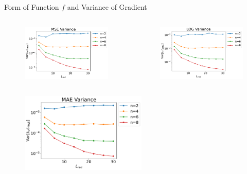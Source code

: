 \documentclass[dvipdfmx,10pt,aspectratio=169]{beamer}
\begin{document}
\begin{frame}{Form of Function $f$ and Variance of Gradient}
    \vspace{-10pt}
    \begin{columns}
        \begin{column}{0.5\textwidth}
            \begin{figure}
                \centering\includegraphics[width=6cm]{variance-mse_encoding3.pdf}
            \end{figure}
        \end{column}
        \begin{column}{0.5\textwidth}
            \begin{figure}
                \centering\includegraphics[width=6cm]{variance-log_encoding3.pdf}
            \end{figure}
        \end{column}
    \end{columns}
    \vspace{-15pt}
    \begin{figure}
        \centering\includegraphics[width=6cm]{variance-mae_encoding3.pdf}
    \end{figure}
\end{frame}
\end{document}
